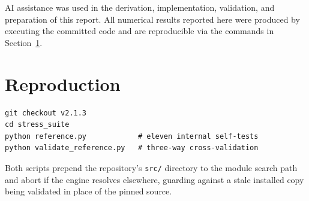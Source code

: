 \documentclass[11pt,a4paper]{article}
\begin{document}
AI assistance was used in the derivation, implementation, validation, and
preparation of this report. All numerical results reported here were produced
by executing the committed code and are reproducible via the commands in
Section~\ref{sec:repro}.

\section{Reproduction}\label{sec:repro}

\begin{lstlisting}
git checkout v2.1.3
cd stress_suite
python reference.py            # eleven internal self-tests
python validate_reference.py   # three-way cross-validation
\end{lstlisting}

\noindent Both scripts prepend the repository's \texttt{src/} directory to the
module search path and abort if the engine resolves elsewhere, guarding against
a stale installed copy being validated in place of the pinned source.
\end{document}
